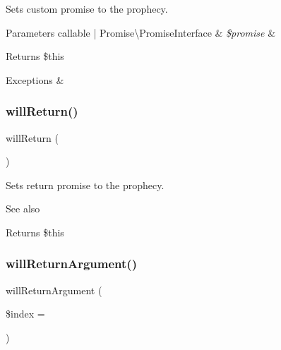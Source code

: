 Sets custom promise to the prophecy.


\begin{DoxyParams}[1]{Parameters}
callable | Promise\textbackslash{}\+Promise\+Interface & {\em \$promise} & \\
\hline
\end{DoxyParams}
\begin{DoxyReturn}{Returns}
\$this
\end{DoxyReturn}

\begin{DoxyExceptions}{Exceptions}
{\em } & \\
\hline
\end{DoxyExceptions}
\mbox{\label{class_prophecy_1_1_prophecy_1_1_method_prophecy_aeacc5dc85f8c17f567e6f07baa1408ab}} 
\subsubsection{\texorpdfstring{will\+Return()}{willReturn()}}
{\footnotesize\ttfamily will\+Return (\begin{DoxyParamCaption}{ }\end{DoxyParamCaption})}

Sets return promise to the prophecy.

\begin{DoxySeeAlso}{See also}

\end{DoxySeeAlso}
\begin{DoxyReturn}{Returns}
\$this 
\end{DoxyReturn}
\mbox{\label{class_prophecy_1_1_prophecy_1_1_method_prophecy_a0fbda70ce0045ba54f32db94bd7404f3}} 
\subsubsection{\texorpdfstring{will\+Return\+Argument()}{willReturnArgument()}}
{\footnotesize\ttfamily will\+Return\+Argument (\begin{DoxyParamCaption}\item[{}]{\$index = {} }\end{DoxyParamCaption})}

